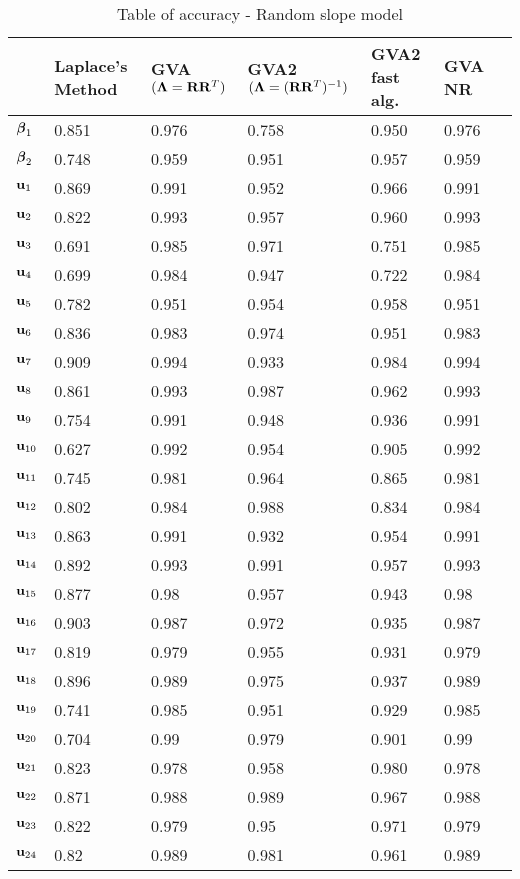 \documentclass{article}[12pt]
\begin{document}
\begin{table}
\label{tab:accuracy_slope}
\caption{Table of accuracy - Random slope model}
\begin{tabular}{l|llllll}
\hline
& Laplace's Method & GVA $({\boldsymbol \Lambda} = {\bf R} {\bf R}^T)$ & GVA2 $({\boldsymbol \Lambda} = ({\bf R} {\bf R}^T)^{-1})$ & GVA2 fast alg. & GVA NR\\
\hline
${\boldsymbol \beta}_1$     &0.851&0.976&0.758&0.950&0.976\\
${\boldsymbol \beta}_2$     &0.748&0.959&0.951&0.957&0.959\\
${\bf u}_1$        &0.869&0.991&0.952&0.966&0.991\\
${\bf u}_2$        &0.822&0.993&0.957&0.960&0.993\\
${\bf u}_3$        &0.691&0.985&0.971&0.751&0.985\\
${\bf u}_4$        &0.699&0.984&0.947&0.722&0.984\\
${\bf u}_5$        &0.782&0.951&0.954&0.958&0.951\\
${\bf u}_6$        &0.836&0.983&0.974&0.951&0.983\\
${\bf u}_7$        &0.909&0.994&0.933&0.984&0.994\\
${\bf u}_8$        &0.861&0.993&0.987&0.962&0.993\\
${\bf u}_9$        &0.754&0.991&0.948&0.936&0.991\\
${\bf u}_{10}$     &0.627&0.992&0.954&0.905&0.992\\
${\bf u}_{11}$     &0.745&0.981&0.964&0.865&0.981\\
${\bf u}_{12}$     &0.802&0.984&0.988&0.834&0.984\\
${\bf u}_{13}$     &0.863&0.991&0.932&0.954&0.991\\
${\bf u}_{14}$     &0.892&0.993&0.991&0.957&0.993\\
${\bf u}_{15}$     &0.877&0.98&0.957&0.943&0.98\\
${\bf u}_{16}$     &0.903&0.987&0.972&0.935&0.987\\
${\bf u}_{17}$     &0.819&0.979&0.955&0.931&0.979\\
${\bf u}_{18}$     &0.896&0.989&0.975&0.937&0.989\\
${\bf u}_{19}$     &0.741&0.985&0.951&0.929&0.985\\
${\bf u}_{20}$     &0.704&0.99&0.979&0.901&0.99\\
${\bf u}_{21}$     &0.823&0.978&0.958&0.980&0.978\\
${\bf u}_{22}$     &0.871&0.988&0.989&0.967&0.988\\
${\bf u}_{23}$     &0.822&0.979&0.95&0.971&0.979\\
${\bf u}_{24}$     &0.82&0.989&0.981&0.961&0.989\\

\end{tabular}
\end{table}
\end{document}
